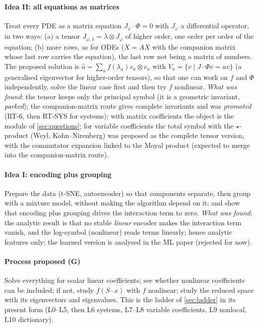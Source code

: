 \documentclass[11pt]{article}
\theoremstyle{plain}
\theoremstyle{definition}
\theoremstyle{remark}
\begin{document}
\paragraph{Idea II: all equations as matrices} Treat every PDE as a matrix equation $J_\varphi\cdot\Phi=0$ with $J_\varphi$ a differential operator, in two ways: (a) a tensor $J_{\omega,\lambda}=\lambda\otimes J_\varphi$ of higher order, one order per order of the equation; (b) more rows, as for ODEs ($\dot X=AX$ with the companion matrix whose last row carries the equation), the last row not being a matrix of numbers.
The proposed solution is $\hat a=\sum_a f(\lambda_a)v_a\otimes v_a$ with $V_a=\{v\mid J\cdot\Phi v=av\}$ (a generalised eigenvector for higher-order tensors), so that one can work on $f$ and $\Phi$ independently, solve the linear case first and then try $f$ nonlinear. \emph{What was found}: the tensor keeps only the principal symbol (it is a geometric invariant, \emph{parked}); the companion-matrix route gives complete invariants and was \emph{promoted} (RT-6, then RT-SYS for systems); with matrix coefficients the object is the module of \cref{sec:questions}; for variable coefficients the total symbol with the $\star$-product (Weyl, Kohn--Nirenberg) was proposed as the complete tensor version, with the commutator expansion linked to the Moyal product (expected to merge into the companion-matrix route).
\paragraph{Idea I: encoding plus grouping} Prepare the data (t-SNE, autoencoder) so that components separate, then group with a mixture model, without making the algorithm depend on it; and show that encoding plus grouping drives the interaction term to zero. \emph{What was found}: the analytic result is that no stable \emph{linear} encoder makes the interaction term vanish, and the log-symbol (nonlinear) reads terms linearly; hence analytic features only; the learned version is analysed in the ML paper (rejected for now).
\paragraph{Process proposed (G)} Solve everything for scalar linear coefficients; see whether nonlinear coefficients can be included; if not, study $f(S\cdot x)$ with $f$ nonlinear; study the reduced space with its eigenvectors and eigenvalues. This is the ladder of \cref{sec:ladder} in its present form (L0--L5, then L6 systems, L7--L8 variable coefficients, L9 nonlocal, L10 dictionary).
\end{document}
